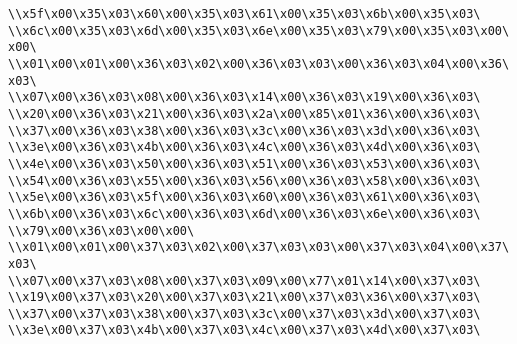 \verb|\\x5f\x00\x35\x03\x60\x00\x35\x03\x61\x00\x35\x03\x6b\x00\x35\x03\|\newline
\verb|\\x6c\x00\x35\x03\x6d\x00\x35\x03\x6e\x00\x35\x03\x79\x00\x35\x03\x00\x00\|\newline
\verb|\\x01\x00\x01\x00\x36\x03\x02\x00\x36\x03\x03\x00\x36\x03\x04\x00\x36\x03\|\newline
\verb|\\x07\x00\x36\x03\x08\x00\x36\x03\x14\x00\x36\x03\x19\x00\x36\x03\|\newline
\verb|\\x20\x00\x36\x03\x21\x00\x36\x03\x2a\x00\x85\x01\x36\x00\x36\x03\|\newline
\verb|\\x37\x00\x36\x03\x38\x00\x36\x03\x3c\x00\x36\x03\x3d\x00\x36\x03\|\newline
\verb|\\x3e\x00\x36\x03\x4b\x00\x36\x03\x4c\x00\x36\x03\x4d\x00\x36\x03\|\newline
\verb|\\x4e\x00\x36\x03\x50\x00\x36\x03\x51\x00\x36\x03\x53\x00\x36\x03\|\newline
\verb|\\x54\x00\x36\x03\x55\x00\x36\x03\x56\x00\x36\x03\x58\x00\x36\x03\|\newline
\verb|\\x5e\x00\x36\x03\x5f\x00\x36\x03\x60\x00\x36\x03\x61\x00\x36\x03\|\newline
\verb|\\x6b\x00\x36\x03\x6c\x00\x36\x03\x6d\x00\x36\x03\x6e\x00\x36\x03\|\newline
\verb|\\x79\x00\x36\x03\x00\x00\|\newline
\verb|\\x01\x00\x01\x00\x37\x03\x02\x00\x37\x03\x03\x00\x37\x03\x04\x00\x37\x03\|\newline
\verb|\\x07\x00\x37\x03\x08\x00\x37\x03\x09\x00\x77\x01\x14\x00\x37\x03\|\newline
\verb|\\x19\x00\x37\x03\x20\x00\x37\x03\x21\x00\x37\x03\x36\x00\x37\x03\|\newline
\verb|\\x37\x00\x37\x03\x38\x00\x37\x03\x3c\x00\x37\x03\x3d\x00\x37\x03\|\newline
\verb|\\x3e\x00\x37\x03\x4b\x00\x37\x03\x4c\x00\x37\x03\x4d\x00\x37\x03\|\newline

